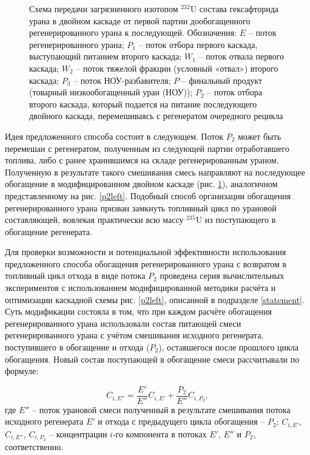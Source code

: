\begin{figure}[ht]
    \caption{Схема передачи загрязненного изотопом $^{232}$U состава гексафторида урана в двойном каскаде от первой партии дообогащенного регенерированного урана к последующей. Обозначения: $E$ -- поток регенерированного урана; $P_1$ -- поток отбора первого каскада, выступающий питанием второго каскада; $W_1$ -- поток отвала первого каскада; $W_2$ -- поток тяжелой фракции (условный «отвал») второго каскада; $P_3$ -- поток НОУ-разбавителя; $P$ -- финальный продукт (товарный низкообогащенный уран (НОУ)); $P_2$ -- поток отбора второго каскада, который подается на питание последующего двойного каскада, перемешиваясь с регенератом очередного рецикла}\label{P2utilizationRing}
\end{figure}

Идея предложенного способа состоит в следующем. Поток $P_2$ может быть перемешан с регенератом, полученным из следующей партии отработавшего топлива, либо с ранее хранившимся на складе регенерированным ураном. Полученную в результате такого смешивания смесь направляют на последующее обогащение в модифицированном двойном каскаде (рис. \ref{P2utilizationRing}), аналогичном представленному на рис. \ref{p2left}. Подобный способ организации обогащения регенерированного урана призван замкнуть топливный цикл по урановой составляющей, вовлекая практически всю массу $^{235}$U из поступающего в обогащение регенерата.

Для проверки возможности и потенциальной эффективности использования предложенного способа обогащения регенерированного урана с возвратом в топливный цикл отхода в виде потока $P_2$ проведена серия вычислительных экспериментов с использованием модифицированной методики расчёта и оптимизации каскадной схемы рис. \ref{p2left}, описанной в подразделе \ref{statement}. Суть модификации состояла в том, что при каждом расчёте обогащения регенерированного урана использовали состав питающей смеси регенерированного урана с учётом смешивания исходного регенерата, поступившего в обогащение и отхода ($P_2$), оставшегося после прошлого цикла обогащения. Новый состав поступающей в обогащение смеси рассчитывали по формуле:

\begin{equation} \label{Cie} 
    C_{i,E''}=\frac{E'}{E''}{C_{i,{E'}}} + \frac{P_2}{E''}{C_{i,{P_2}}},
\end{equation}
где $E''$ -- поток урановой смеси полученный в результате смешивания потока исходного регенерата $E'$ и отхода с предыдущего цикла обогащения -- $P_2$; $C_{i,E'}$, $C_{i,E''}$, $C_{i,{P_2}}$ -- концентрации $i$-го компонента в потоках $E'$, $E''$ и $P_2$, соответственно.     

